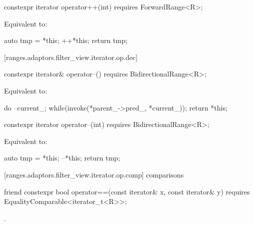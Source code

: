 %
\begin{itemdecl}
constexpr iterator operator++(int) requires ForwardRange<R>;
\end{itemdecl}

\begin{itemdescr}
\pnum
\effects Equivalent to:
\begin{codeblock}
auto tmp = *this;
++*this;
return tmp;
\end{codeblock}
\end{itemdescr}

[ranges.adaptors.filter_view.iterator.op.dec]{}

%
\begin{itemdecl}
constexpr iterator& operator--() requires BidirectionalRange<R>;
\end{itemdecl}

\begin{itemdescr}
\pnum
\effects Equivalent to:
\begin{codeblock}
do
  --current_;
while(invoke(*parent_->pred_, *current_));
return *this;
\end{codeblock}
\end{itemdescr}

%
\begin{itemdecl}
constexpr iterator operator--(int) requires BidirectionalRange<R>;
\end{itemdecl}

\begin{itemdescr}
\pnum
\effects Equivalent to:
\begin{codeblock}
auto tmp = *this;
--*this;
return tmp;
\end{codeblock}
\end{itemdescr}

[ranges.adaptors.filter_view.iterator.op.comp]{ comparisons}

%
\begin{itemdecl}
friend constexpr bool operator==(const iterator& x, const iterator& y)
  requires EqualityComparable<iterator_t<R>>;
\end{itemdecl}

\begin{itemdescr}
\pnum
\returns {}.
\end{itemdescr}

